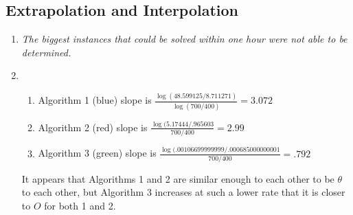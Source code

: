 \documentclass{article}
\begin{document}
\subsection*{Extrapolation and Interpolation}

\begin{enumerate}
\item \emph{The biggest instances that could be solved within one hour were not able to be determined.}
\item \begin{enumerate}
\item Algorithm 1 (blue) slope is $\frac{\log(48.599125/8.711271)}{\log(700/400)} = 3.072$
\item Algorithm 2 (red) slope is $\frac{\log(5.17444/.965603}{700/400} = 2.99$
\item Algorithm 3 (green) slope is $\frac{\log(.00106699999999/.000685000000001}{700/400} = .792$
\end{enumerate}
It appears that Algorithms 1 and 2 are similar enough to each other to be $\theta$ to each other, but Algorithm 3 increases at such a lower rate that it is closer to $O$ for both 1 and 2.
\end{enumerate}
\end{document}
